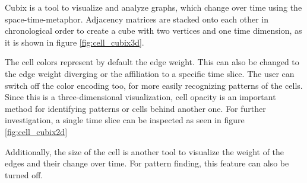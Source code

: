 Cubix is a tool to visualize and analyze graphs, which change over time using the space-time-metaphor. Adjacency matrices are stacked onto each other in chronological order to create a cube with two vertices and one time dimension, as it is shown in figure \ref{fig:cell_cubix3d}.

The cell colors represent by default the edge weight. This can also be changed to the edge weight diverging or the affiliation to a specific time slice. The user can switch off the color encoding too, for more easily recognizing patterns of the cells. Since this is a three-dimensional visualization, cell opacity is an important method for identifying patterns or cells behind another one. For further investigation, a single time slice can be inspected as seen in figure \ref{fig:cell_cubix2d}

Additionally, the size of the cell is another tool to visualize the weight of the edges and their change over time. For pattern finding, this feature can also be turned off.  \citep[877--886]{bach-cubix-2014}
